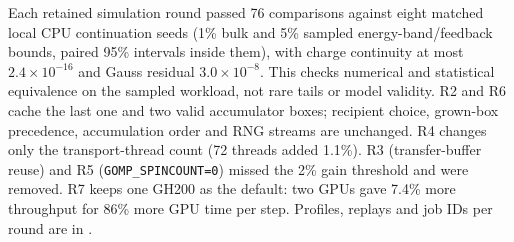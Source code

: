 \documentclass[11pt]{article}
\begin{document}
Each retained simulation round passed 76 comparisons against eight matched local CPU
continuation seeds (1\% bulk and 5\% sampled energy-band/feedback bounds,
paired 95\% intervals inside them), with charge continuity at most
$2.4\times10^{-16}$ and Gauss residual $3.0\times10^{-8}$. This checks
numerical and statistical equivalence on the sampled workload, not rare tails
or model validity. R2 and R6 cache the last one and two valid accumulator
boxes; recipient choice, grown-box precedence, accumulation order and RNG
streams are unchanged. R4 changes only the transport-thread count (72 threads
added 1.1\%). R3 (transfer-buffer reuse) and R5 (\texttt{GOMP\_SPINCOUNT=0})
missed the 2\% gain threshold and were removed. R7 keeps one GH200 as the
default: two GPUs gave 7.4\% more throughput for 86\% more GPU time per step.
Profiles, replays and job IDs per round are in .
\end{document}
